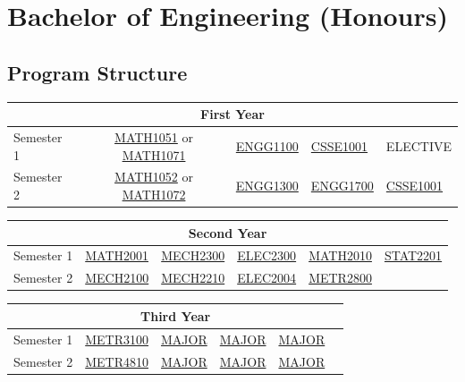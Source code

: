 \documentclass[a4paper,12pt]{report}
\begin{document}
\section{Bachelor of Engineering (Honours)}
\subsection{Program Structure}
\renewcommand{\arraystretch}{1.5}
\begin{table}[H]
    \centering
    \begin{tabular}{| m{6em} | m{5em} m{5em} m{5em} m{5em} m{5em} |}
        \hline
        \multicolumn{6}{|c|}{\bfseries First Year} \\
        \hline
        Semester 1 & \multicolumn{2}{c}{\hyperlink{MATH1051}{MATH1051} or \hyperlink{MATH1071}{MATH1071}} & \hyperlink{ENGG1100}{ENGG1100} & \hyperlink{CSSE1001}{CSSE1001} & ELECTIVE \\
        Semester 2 & \multicolumn{2}{c}{\hyperlink{MATH1052}{MATH1052} or \hyperlink{MATH1072}{MATH1072}} & \hyperlink{ENGG1300}{ENGG1300} & \hyperlink{ENGG1700}{ENGG1700} & \hyperlink{CSSE1001}{CSSE1001} \\
        \hline
    \end{tabular}
\end{table}
\begin{table}[H]
    \centering
    \begin{tabular}{| m{6em} | m{5em} m{5em} m{5em} m{5em} m{5em} |}
        \hline
        \multicolumn{6}{|c|}{\bfseries Second Year} \\
        \hline
        Semester 1 & \hyperlink{MATH2001}{MATH2001} & \hyperlink{MECH2300}{MECH2300} & \hyperlink{ELEC2300}{ELEC2300} & \hyperlink{MATH2010}{MATH2010} & \hyperlink{STAT2201}{STAT2201} \\
        Semester 2 & \hyperlink{MECH2100}{MECH2100} & \hyperlink{MECH2210}{MECH2210} & \hyperlink{ELEC2004}{ELEC2004} & \hyperlink{METR2800}{METR2800} & \\
        \hline
    \end{tabular}
\end{table}
\begin{table}[H]
    \centering
    \begin{tabular}{| m{6em} | m{5em} m{5em} m{5em} m{5em} m{5em} |}
        \hline
        \multicolumn{6}{|c|}{\bfseries Third Year} \\
        \hline
        Semester 1 & \hyperlink{METR3100}{METR3100} & \hyperlink{MAJOR}{MAJOR} & \hyperlink{MAJOR}{MAJOR} & \hyperlink{MAJOR}{MAJOR} & \\
        Semester 2 & \hyperlink{METR4810}{METR4810} & \hyperlink{MAJOR}{MAJOR} & \hyperlink{MAJOR}{MAJOR} & \hyperlink{MAJOR}{MAJOR} & \\
        \hline
    \end{tabular}
\end{table}
\end{document}
